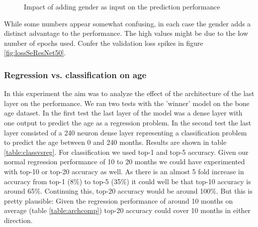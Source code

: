 \documentclass[10pt,twocolumn,letterpaper]{article}
\begin{document}
\begin{figure}[H]
    \centering
\caption{Impact of adding gender as input on the prediction performance}
\label{fig:gender}
\end{figure}

While some numbers appear somewhat confusing, in each case the gender adds a distinct advantage to the performance. The high values might be due to the low number of epochs used. Confer the validation loss spikes in figure \ref{fig:lossSeResNet50}.

\subsubsection{Regression vs. classification on age}
In this experiment the aim was to analyze the effect of the architecture of the last layer on the performance. We ran two tests with the 'winner' model on the bone age dataset. In the first test the last layer of the model was a dense layer with one output to predict the age as a regression problem. In the second test the last layer consisted of a 240 neuron dense layer representing a classification problem to predict the age between 0 and 240 months. Results are shown in table \ref{table:classvsreg}. For classification we used top-1 and top-5 accuracy. Given our normal regression performance of 10 to 20 months we could have experimented with \eg top-10 or top-20 accuracy as well. As there is an almost 5 fold increase in accuracy from top-1 (8\%) to top-5 (35\%) it could well be that top-10 accuracy is around 65\%. Continuing this, top-20 accuracy would be around 100\%. But this is pretty plausible: Given the regression performance of around 10 months on average (table \ref{table:archcomp}) top-20 accuracy could cover 10 months in either direction.
\end{document}
